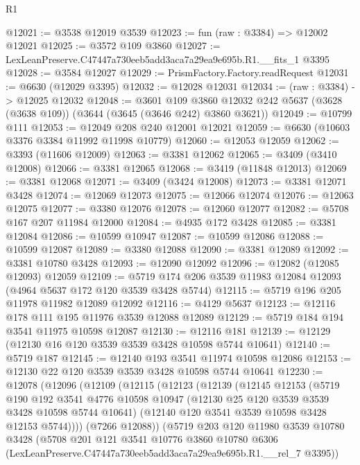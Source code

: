 \begin{lexlean}{R1}
\begin{coremodule}
@12021 := @3538 @12019 @3539
@12023 := fun (raw : @3384) => @12002 @12021
@12025 := @3572 @109 @3860
@12027 := LexLeanPreserve.C47447a730eeb5add3aca7a29ea9e695b.R1.__fits_1 @3395
@12028 := @3584 @12027
@12029 := PrismFactory.Factory.readRequest
@12031 := @6630 (@12029 @3395)
@12032 := @12028 @12031
@12034 := (raw : @3384) -> @12025 @12032
@12048 := @3601
    @109
    @3860
    @12032
    @242
    @5637
    (@3628 (@3638 @109))
    (@3644 (@3645 (@3646 @242) @3860 @3621))
@12049 := @10799 @111
@12053 := @12049 @208 @240 @12001 @12021
@12059 := @6630 (@10603 @3376 @3384 @11992 @11998 @10779)
@12060 := @12053 @12059
@12062 := @3393 (@11606 @12009)
@12063 := @3381 @12062
@12065 := @3409 (@3410 @12008)
@12066 := @3381 @12065
@12068 := @3419 (@11848 @12013)
@12069 := @3381 @12068
@12071 := @3409 (@3424 @12008)
@12073 := @3381 @12071 @3428
@12074 := @12069 @12073
@12075 := @12066 @12074
@12076 := @12063 @12075
@12077 := @3380 @12076
@12078 := @12060 @12077
@12082 := @5708 @167 @207 @11984 @12000
@12084 := @4935 @172 @3428
@12085 := @3381 @12084
@12086 := @10599 @10947
@12087 := @10599 @12086
@12088 := @10599 @12087
@12089 := @3380 @12088
@12090 := @3381 @12089
@12092 := @3381 @10780 @3428
@12093 := @12090 @12092
@12096 := @12082 (@12085 @12093) @12059
@12109 := @5719 @174 @206 @3539 @11983 @12084 @12093 (@4964 @5637 @172 @120 @3539 @3428 @5744)
@12115 := @5719 @196 @205 @11978 @11982 @12089 @12092
@12116 := @4129 @5637
@12123 := @12116 @178 @111 @195 @11976 @3539 @12088 @12089
@12129 := @5719 @184 @194 @3541 @11975 @10598 @12087
@12130 := @12116 @181
@12139 := @12129 (@12130 @16 @120 @3539 @3539 @3428 @10598 @5744 @10641)
@12140 := @5719 @187
@12145 := @12140 @193 @3541 @11974 @10598 @12086
@12153 := @12130 @22 @120 @3539 @3539 @3428 @10598 @5744 @10641
@12230 := @12078
    (@12096
      (@12109
        (@12115
          (@12123
            (@12139
              (@12145
                @12153
                (@5719
                  @190
                  @192
                  @3541
                  @4776
                  @10598
                  @10947
                  (@12130 @25 @120 @3539 @3539 @3428 @10598 @5744 @10641)
                  (@12140 @120 @3541 @3539 @10598 @3428 @12153 @5744))))
            (@7266 @12088))
          (@5719
            @203
            @120
            @11980
            @3539
            @10780
            @3428
            (@5708
              @201
              @121
              @3541
              @10776
              @3860
              @10780
              @6306
              (LexLeanPreserve.C47447a730eeb5add3aca7a29ea9e695b.R1.__rel_7 @3395))

\end{coremodule}
\end{lexlean}
